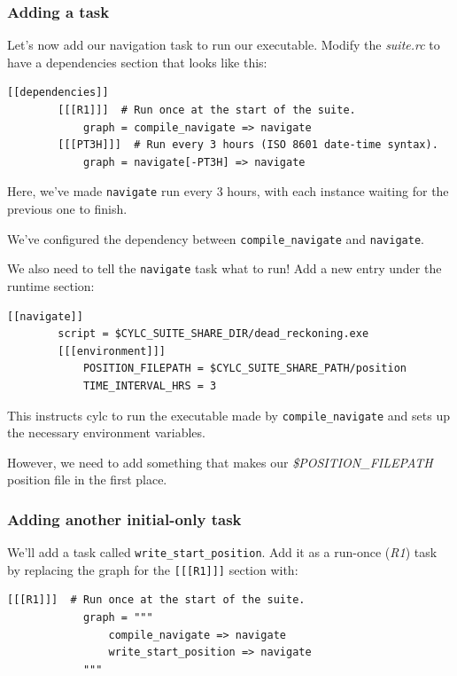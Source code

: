 \subsubsection{Adding a task}

    Let's now add our navigation task to run our executable. Modify the {\em suite.rc} to have a dependencies section that looks like this:
\lstset{language=suiterc}
\begin{lstlisting}[columns=fullflexible]
    [[dependencies]]
        [[[R1]]]  # Run once at the start of the suite.
            graph = compile_navigate => navigate
        [[[PT3H]]]  # Run every 3 hours (ISO 8601 date-time syntax).
            graph = navigate[-PT3H] => navigate
\end{lstlisting}

Here, we've made \lstinline{navigate} run every 3 hours, with each instance waiting for the previous one to finish.

We've configured the dependency between \lstinline{compile_navigate} and \lstinline{navigate}.

We also need to tell the \lstinline{navigate} task what to run! Add a new entry under the runtime section:

\lstset{language=suiterc}
\begin{lstlisting}[columns=fullflexible]
    [[navigate]]
        script = $CYLC_SUITE_SHARE_DIR/dead_reckoning.exe
        [[[environment]]]
            POSITION_FILEPATH = $CYLC_SUITE_SHARE_PATH/position
            TIME_INTERVAL_HRS = 3
\end{lstlisting}

This instructs cylc to run the executable made by \lstinline{compile_navigate} and sets up the necessary environment variables.

However, we need to add something that makes our {\em \$POSITION\_FILEPATH} position file in the first place.

\subsubsection{Adding another initial-only task}

We'll add a task called \lstinline{write_start_position}. Add it as a run-once ({\em R1}) task by replacing the graph for the \lstinline{[[[R1]]]} section with:

\lstset{language=suiterc}
\begin{lstlisting}[columns=fullflexible]
        [[[R1]]]  # Run once at the start of the suite.
            graph = """
                compile_navigate => navigate
                write_start_position => navigate
            """
\end{lstlisting}

